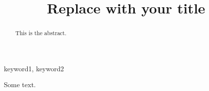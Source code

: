 \documentclass{mcmthesis}
\title{Replace with your title}
\begin{document}
  \begin{abstract}
    This is the abstract.
  \end{abstract}

  \begin{keywords}
    keyword1, keyword2
  \end{keywords}
  \maketitle
  Some text.
\end{document}
